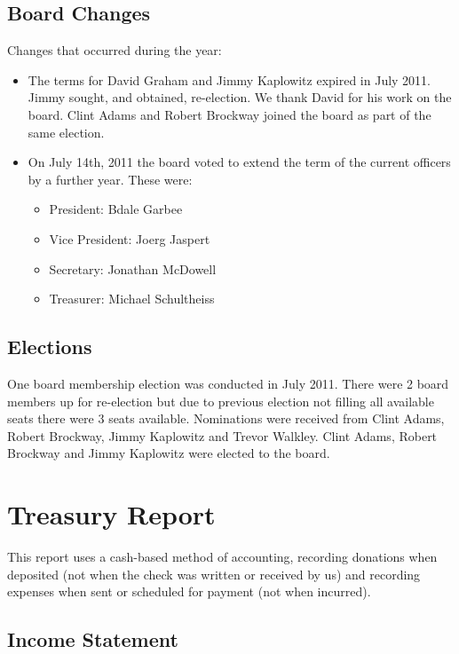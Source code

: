\documentclass[letterpaper]{report}
\begin{document}
\section{Board Changes}

Changes that occurred during the year:

\begin{itemize}
\item The terms for David Graham and Jimmy Kaplowitz expired in July 2011.
Jimmy sought, and obtained, re-election. We thank David for his work on the
board. Clint Adams and Robert Brockway joined the board as part of the same
election.
\item On July 14th, 2011 the board voted to extend the term of the current
officers by a further year. These were:
\begin{itemize}
\item President: Bdale Garbee
\item Vice President: Joerg Jaspert
\item Secretary: Jonathan McDowell
\item Treasurer: Michael Schultheiss
\end{itemize}
\end{itemize}

\section{Elections}

One board membership election was conducted in July 2011. There were 2 board
members up for re-election but due to previous election not filling all
available seats there were 3 seats available. Nominations were received from
Clint Adams, Robert Brockway, Jimmy Kaplowitz and Trevor Walkley. Clint Adams,
Robert Brockway and Jimmy Kaplowitz were elected to the board.

\chapter{Treasury Report}

This report uses a cash-based method of accounting, recording donations when
deposited (not when the check was written or received by us) and recording
expenses when sent or scheduled for payment (not when incurred).

\section{Income Statement}
\end{document}
